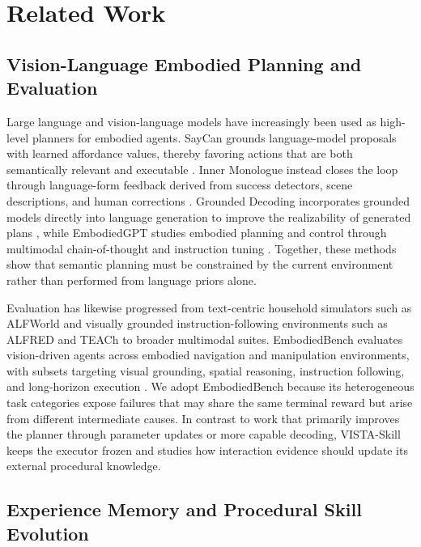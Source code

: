 \section{Related Work}

\subsection{Vision-Language Embodied Planning and Evaluation}

Large language and vision-language models have increasingly been used as high-level planners for embodied agents. SayCan grounds language-model proposals with learned affordance values, thereby favoring actions that are both semantically relevant and executable \cite{ichterCanNotSay2023}. Inner Monologue instead closes the loop through language-form feedback derived from success detectors, scene descriptions, and human corrections \cite{huangInnerMonologueEmbodied2023}. Grounded Decoding incorporates grounded models directly into language generation to improve the realizability of generated plans \cite{huangGroundedDecodingGuiding2023}, while EmbodiedGPT studies embodied planning and control through multimodal chain-of-thought and instruction tuning \cite{muEmbodiedGPTVisionLanguagePreTraining2023}. Together, these methods show that semantic planning must be constrained by the current environment rather than performed from language priors alone.

Evaluation has likewise progressed from text-centric household simulators such as ALFWorld \cite{shridharALFWorldAligningText2021} and visually grounded instruction-following environments such as ALFRED \cite{shridharALFREDBenchmarkInterpreting2020} and TEACh \cite{padmakumarTEAChTaskDrivenEmbodied2022} to broader multimodal suites. EmbodiedBench evaluates vision-driven agents across embodied navigation and manipulation environments, with subsets targeting visual grounding, spatial reasoning, instruction following, and long-horizon execution \cite{yangEmbodiedBenchComprehensiveBenchmarking2025}. We adopt EmbodiedBench because its heterogeneous task categories expose failures that may share the same terminal reward but arise from different intermediate causes. In contrast to work that primarily improves the planner through parameter updates or more capable decoding, VISTA-Skill keeps the executor frozen and studies how interaction evidence should update its external procedural knowledge.

\subsection{Experience Memory and Procedural Skill Evolution}

